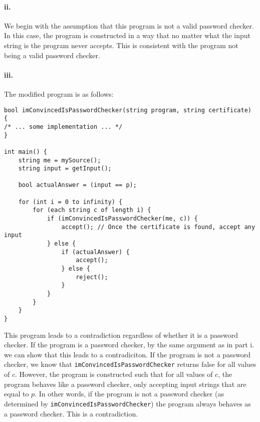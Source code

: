 \documentclass[10pt,letter]{article}
\begin{document}
\paragraph{ii.} We begin with the assumption that this program is not a valid password checker. In this case, the program is constructed in a way that no matter what the input string is the program never accepts. This is consistent with the program not being a valid password checker.

\paragraph{iii.} The modified program is as follows:\\

\begin{lstlisting}
bool imConvincedIsPasswordChecker(string program, string certificate) { 
/* ... some implementation ... */ 
}

int main() {
    string me = mySource();
    string input = getInput();

    bool actualAnswer = (input == p);

    for (int i = 0 to infinity) {
        for (each string c of length i) {
            if (imConvincedIsPasswordChecker(me, c)) {                
                accept(); // Once the certificate is found, accept any input
            } else {
                if (actualAnswer) {
                    accept();
                } else {
                    reject();
                }
            }
        }
    }
}
\end{lstlisting}

This program leads to a contradiction regardless of whether it is a password checker. If the program is a password checker, by the same argument as in part i. we can show that this leads to a contradiciton. If the program is not a password checker, we know that \texttt{imConvincedIsPasswordChecker} returns false for all values of $c$. However, the program is constructed such that for all values of $c$, the program behaves like a password checker, only accepting input strings that are equal to $p$. In other words, if the program is not a password checker (as determined by \texttt{imConvincedIsPasswordChecker}) the program always behaves as a password checker. This is a contradiction. 
\end{document}
